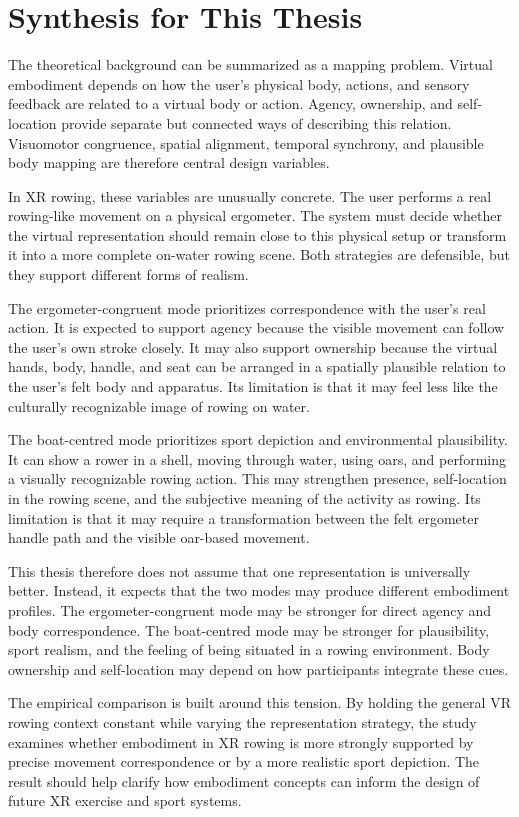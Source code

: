 \section{Synthesis for This Thesis}
\label{sec:background_synthesis}

The theoretical background can be summarized as a mapping problem. Virtual embodiment depends on how the user's physical body, actions, and sensory feedback are related to a virtual body or action. Agency, ownership, and self-location provide separate but connected ways of describing this relation. Visuomotor congruence, spatial alignment, temporal synchrony, and plausible body mapping are therefore central design variables.

In XR rowing, these variables are unusually concrete. The user performs a real rowing-like movement on a physical ergometer. The system must decide whether the virtual representation should remain close to this physical setup or transform it into a more complete on-water rowing scene. Both strategies are defensible, but they support different forms of realism.

The ergometer-congruent mode prioritizes correspondence with the user's real action. It is expected to support agency because the visible movement can follow the user's own stroke closely. It may also support ownership because the virtual hands, body, handle, and seat can be arranged in a spatially plausible relation to the user's felt body and apparatus. Its limitation is that it may feel less like the culturally recognizable image of rowing on water.

The boat-centred mode prioritizes sport depiction and environmental plausibility. It can show a rower in a shell, moving through water, using oars, and performing a visually recognizable rowing action. This may strengthen presence, self-location in the rowing scene, and the subjective meaning of the activity as rowing. Its limitation is that it may require a transformation between the felt ergometer handle path and the visible oar-based movement.

This thesis therefore does not assume that one representation is universally better. Instead, it expects that the two modes may produce different embodiment profiles. The ergometer-congruent mode may be stronger for direct agency and body correspondence. The boat-centred mode may be stronger for plausibility, sport realism, and the feeling of being situated in a rowing environment. Body ownership and self-location may depend on how participants integrate these cues.

The empirical comparison is built around this tension. By holding the general VR rowing context constant while varying the representation strategy, the study examines whether embodiment in XR rowing is more strongly supported by precise movement correspondence or by a more realistic sport depiction. The result should help clarify how embodiment concepts can inform the design of future XR exercise and sport systems.
